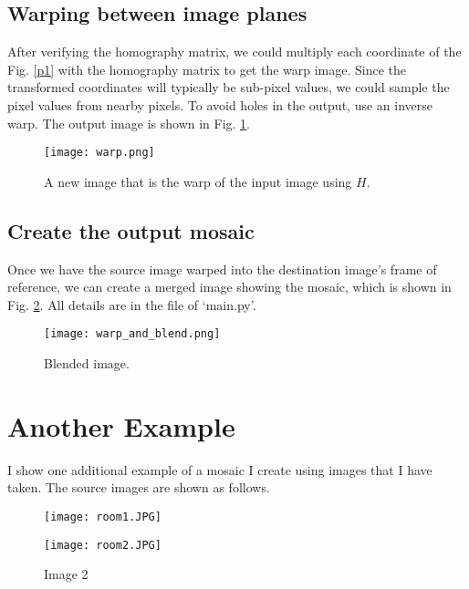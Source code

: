 \documentclass[UTF8,a4paper,10pt]{ctexart}
\begin{document}
\subsection{Warping between image planes}

After verifying the homography matrix, we could multiply each coordinate of the Fig. \ref{p1} with the homography matrix to get the warp image. Since the transformed coordinates will typically be sub-pixel values, we could sample the pixel values from nearby pixels. To avoid holes in the output, use an inverse warp. The output image is shown in Fig. \ref{warp}.
\begin{figure}[H]
\centerline{\texttt{[image: warp.png]}}
\caption{A new image that is the warp of the input image using $H$.}
\label{warp}
\end{figure}

\subsection{Create the output mosaic}
Once we have the source image warped into the destination image’s frame of reference, we can create a merged image showing the mosaic, which is shown in Fig. \ref{blend}.
All details are in the file of `main.py'.
\begin{figure}[H]
\centerline{\texttt{[image: warp\_and\_blend.png]}}
\caption{Blended image.}
\label{blend}
\end{figure}


\section{Another Example}
I show one additional example of a mosaic I create using images that I have taken. The source images are shown as follows.
\begin{figure}[H]
	\centering
	\begin{minipage}[t]{0,40\textwidth}	
		\centering
		\texttt{[image: room1.JPG]} %
		\caption{Image 1} %
	\end{minipage}
	\hfil
	\begin{minipage}[t]{0,40\textwidth}	
		\centering
		\texttt{[image: room2.JPG]} %
		\caption{Image 2} %
	\end{minipage}
\end{figure}
\end{document}
